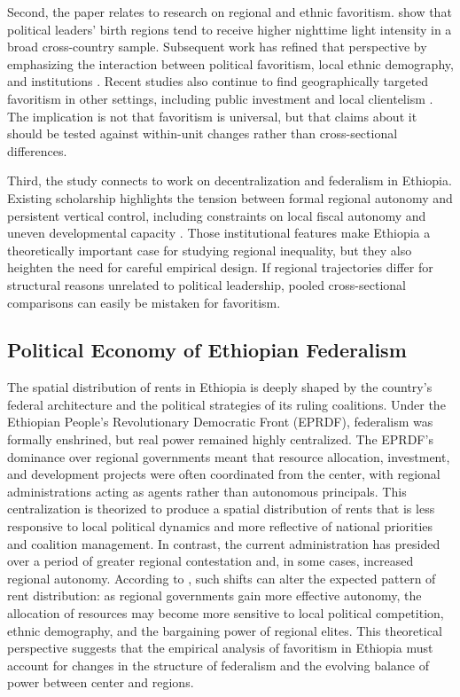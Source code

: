 \documentclass[12pt,a4paper]{article}
\begin{document}
Second, the paper relates to research on regional and ethnic favoritism. \citet{Hodler2014} show that political leaders' birth regions tend to receive higher nighttime light intensity in a broad cross-country sample. Subsequent work has refined that perspective by emphasizing the interaction between political favoritism, local ethnic demography, and institutions \citep{BeiserMcGrath2021}. Recent studies also continue to find geographically targeted favoritism in other settings, including public investment and local clientelism \citep{Onana2024,Cruzatti2024}. The implication is not that favoritism is universal, but that claims about it should be tested against within-unit changes rather than cross-sectional differences.




Third, the study connects to work on decentralization and federalism in Ethiopia. Existing scholarship highlights the tension between formal regional autonomy and persistent vertical control, including constraints on local fiscal autonomy and uneven developmental capacity \citep{Faguet2021,Wubneh2017}. Those institutional features make Ethiopia a theoretically important case for studying regional inequality, but they also heighten the need for careful empirical design. If regional trajectories differ for structural reasons unrelated to political leadership, pooled cross-sectional comparisons can easily be mistaken for favoritism.

\subsection*{Political Economy of Ethiopian Federalism}
The spatial distribution of rents in Ethiopia is deeply shaped by the country’s federal architecture and the political strategies of its ruling coalitions. Under the Ethiopian People’s Revolutionary Democratic Front (EPRDF), federalism was formally enshrined, but real power remained highly centralized. The EPRDF’s dominance over regional governments meant that resource allocation, investment, and development projects were often coordinated from the center, with regional administrations acting as agents rather than autonomous principals. This centralization is theorized to produce a spatial distribution of rents that is less responsive to local political dynamics and more reflective of national priorities and coalition management. In contrast, the current administration has presided over a period of greater regional contestation and, in some cases, increased regional autonomy. According to \citet{Faguet2021}, such shifts can alter the expected pattern of rent distribution: as regional governments gain more effective autonomy, the allocation of resources may become more sensitive to local political competition, ethnic demography, and the bargaining power of regional elites. This theoretical perspective suggests that the empirical analysis of favoritism in Ethiopia must account for changes in the structure of federalism and the evolving balance of power between center and regions.
\end{document}
